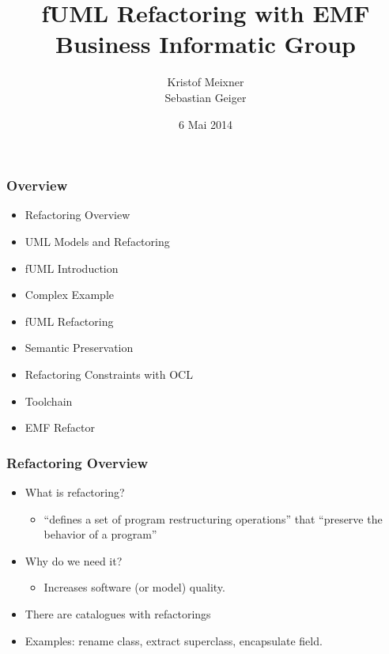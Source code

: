\documentclass{beamer}
\begin{document}
\author{Kristof Meixner \\ Sebastian Geiger}
\date{6 Mai 2014}
\title{fUML Refactoring with EMF\\\small{Business Informatic Group}}

\begin{frame}
 \maketitle
\end{frame}


\begin{frame}
 \frametitle{Overview}



\begin{itemize}
 \item Refactoring Overview
 \item UML Models and Refactoring
 \item fUML Introduction
 \item Complex Example
 \item fUML Refactoring
 \item Semantic Preservation
 \item Refactoring Constraints with OCL
 \item Toolchain
 \item EMF Refactor
\end{itemize}

\end{frame}

\begin{frame}[fragile]
\frametitle{Refactoring Overview}
\begin{itemize}
 \item What is refactoring?
 \begin{itemize}
  \item ``defines a set of program restructuring operations'' that ``preserve the behavior of a program'' \cite{mast:REFOOF}
 \end{itemize}
 \item Why do we need it?
 \begin{itemize}
  \item Increases software (or model) quality.
 \end{itemize}
 \item There are catalogues with refactorings \cite{fow99}
 \item Examples: rename class, extract superclass, encapsulate field.
\end{itemize}

\end{frame}
\end{document}
